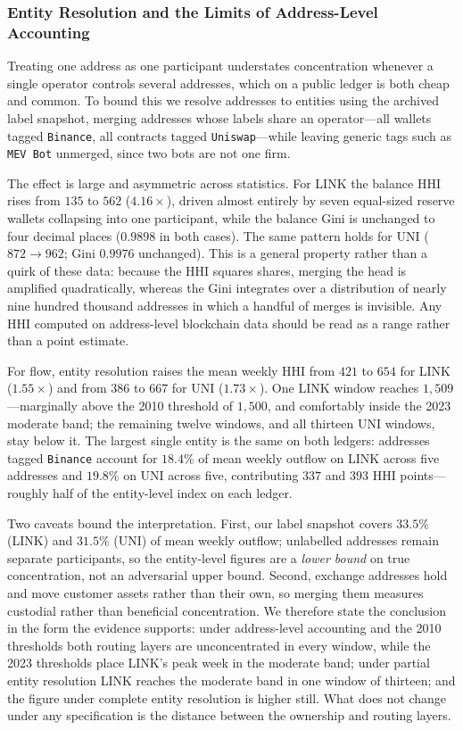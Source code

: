 \documentclass[final,5p,times]{elsarticle}
\begin{document}
\subsubsection{Entity Resolution and the Limits of Address-Level Accounting}
\label{sec:entity}
Treating one address as one participant understates concentration whenever a
single operator controls several addresses, which on a public ledger is both
cheap and common. To bound this we resolve addresses to entities using the
archived label snapshot, merging addresses whose labels share an
operator---all wallets tagged \texttt{Binance}, all contracts tagged
\texttt{Uniswap}---while leaving generic tags such as \texttt{MEV Bot}
unmerged, since two bots are not one firm.

The effect is large and asymmetric across statistics. For LINK the balance
HHI rises from $135$ to $562$ ($4.16\times$), driven almost entirely by seven
equal-sized reserve wallets collapsing into one participant, while the
balance Gini is unchanged to four decimal places ($0.9898$ in both cases).
The same pattern holds for UNI ($872 \rightarrow 962$; Gini $0.9976$
unchanged). This is a general property rather than a quirk of these data:
because the HHI squares shares, merging the head is amplified
quadratically, whereas the Gini integrates over a distribution of nearly nine
hundred thousand addresses in which a handful of merges is invisible. Any HHI
computed on address-level blockchain data should be read as a range rather
than a point estimate.

For flow, entity resolution raises the mean weekly HHI from $421$ to $654$
for LINK ($1.55\times$) and from $386$ to $667$ for UNI ($1.73\times$). One LINK window reaches $1{,}509$---marginally above the 2010 threshold of
$1{,}500$, and comfortably inside the 2023 moderate band; the
remaining twelve windows, and all thirteen UNI windows, stay below it. The
largest single entity is the same on both ledgers: addresses tagged
\texttt{Binance} account for $18.4\%$ of mean weekly outflow on LINK across
five addresses and $19.8\%$ on UNI across five, contributing $337$ and $393$
HHI points---roughly half of the entity-level index on each ledger.

Two caveats bound the interpretation. First, our label snapshot covers
$33.5\%$ (LINK) and $31.5\%$ (UNI) of mean weekly outflow; unlabelled
addresses remain separate participants, so the entity-level figures are a
\emph{lower bound} on true concentration, not an adversarial upper bound.
Second, exchange addresses hold and move customer assets rather than their
own, so merging them measures custodial rather than beneficial
concentration. We therefore state the conclusion in the form the evidence
supports: under address-level accounting and the 2010 thresholds both routing layers
are unconcentrated in every window, while the 2023 thresholds place LINK's
peak week in the moderate band; under partial entity resolution LINK reaches
the moderate band in one window of thirteen; and the figure under complete
entity resolution is higher still. What does not change under any
specification is the distance between the ownership and routing layers.
\end{document}
